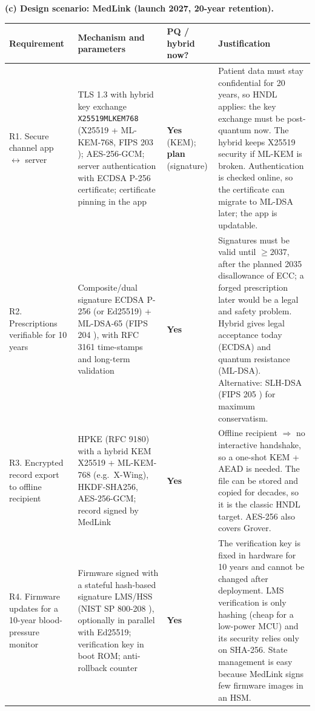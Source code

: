 \documentclass[11pt,a4paper]{article}
\begin{document}
\begin{table}[H]
\textbf{(c) Design scenario: MedLink (launch 2027, 20-year retention).}\par\smallskip
\centering\small
\begin{tabularx}{\textwidth}{@{}>{\raggedright\arraybackslash}p{2.6cm}>{\raggedright\arraybackslash}p{4.0cm}>{\raggedright\arraybackslash}p{1.7cm}L@{}}
\toprule
Requirement & Mechanism and parameters & PQ / hybrid now? & Justification \\
\midrule
R1. Secure channel app $\leftrightarrow$ server & TLS 1.3 with hybrid key exchange \texttt{X25519MLKEM768} (X25519 + ML-KEM-768, FIPS 203 \cite{fips203}); AES-256-GCM; server authentication with ECDSA P-256 certificate; certificate pinning in the app & \textbf{Yes} (KEM); \textbf{plan} (signature) & Patient data must stay confidential for 20 years, so HNDL applies: the key exchange must be post-quantum now. The hybrid keeps X25519 security if ML-KEM is broken. Authentication is checked online, so the certificate can migrate to ML-DSA later; the app is updatable. \\
R2. Prescriptions verifiable for 10 years & Composite/dual signature ECDSA P-256 (or Ed25519) + ML-DSA-65 (FIPS 204 \cite{fips204}), with RFC 3161 time-stamps and long-term validation & \textbf{Yes} & Signatures must be valid until $\ge 2037$, after the planned 2035 disallowance of ECC; a forged prescription later would be a legal and safety problem. Hybrid gives legal acceptance today (ECDSA) and quantum resistance (ML-DSA). Alternative: SLH-DSA (FIPS 205 \cite{fips205}) for maximum conservatism. \\
R3. Encrypted record export to offline recipient & HPKE (RFC 9180) with a hybrid KEM X25519 + ML-KEM-768 (e.g.\ X-Wing), HKDF-SHA256, AES-256-GCM; record signed by MedLink & \textbf{Yes} & Offline recipient $\Rightarrow$ no interactive handshake, so a one-shot KEM + AEAD is needed. The file can be stored and copied for decades, so it is the classic HNDL target. AES-256 also covers Grover. \\
R4. Firmware updates for a 10-year blood-pressure monitor & Firmware signed with a stateful hash-based signature LMS/HSS (NIST SP 800-208 \cite{sp800208}), optionally in parallel with Ed25519; verification key in boot ROM; anti-rollback counter & \textbf{Yes} & The verification key is fixed in hardware for 10 years and cannot be changed after deployment. LMS verification is only hashing (cheap for a low-power MCU) and its security relies only on SHA-256. State management is easy because MedLink signs few firmware images in an HSM. \\
\bottomrule
\end{tabularx}
\end{table}
\end{document}
